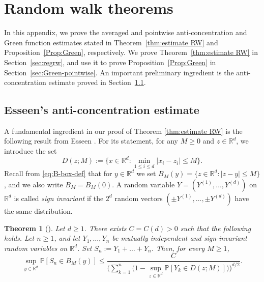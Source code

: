 \documentclass[11pt,a4paper]{article}
\numberwithin{equation}{section}
\theoremstyle{plain}
\newtheorem{Thm}{Theorem}[section]
\theoremstyle{definition}
\newcommand\1{\mathds{1}}
\begin{document}
\appendix

\section{Random walk theorems}
\label{appendix: rw}

In this appendix, we prove the averaged and pointwise
anti-concentration and Green function estimates stated in
Theorem~\ref{thm:estimate RW} and
Proposition~\ref{Prop:Green}, respectively.
We prove Theorem~\ref{thm:estimate RW} in Section~\ref{sec:regrw},
and use it to prove Proposition~\ref{Prop:Green} in Section~\ref{sec:Green-pointwise}.
An important preliminary ingredient is the anti-concentration estimate
proved in Section~\ref{sec:Esseen}.

\subsection{Esseen's anti-concentration estimate}
\label{sec:Esseen}

A fundamental ingredient in our proof of Theorem \ref{thm:estimate RW} is the following result from Esseen \cite{Esse66}.
For its statement, for any $M\geq 0$ and $z\in \mathbb R^d$, we introduce the set
\begin{equation}
D(z;M):=\{x\in \mathbb R^d:
\min_{1 \le i \le d}|x_i-z_i|\leq M\}.
\end{equation}
 Recall from \eqref{eq:B-box-def} that for $y\in \mathbb R^d$ we set $B_M(y)=\{z\in \mathbb R^d: |z-y|\leq M\}$, and we also write $B_M=B_M(0)$.
A random variable $Y=(Y^{(1)},\ldots,Y^{(d)})$ on $\mathbb R^d$ is called \emph{sign invariant} if
the $2^d$
random vectors $(\pm Y^{(1)},\ldots,\pm Y^{(d)})$ have the same distribution.

\begin{Thm}[]
\label{thm:esseen}
Let $d\geq 1$. There exists $C=C(d)>0$ such that the following holds. Let $n\geq 1$, and let $Y_1,\ldots,Y_n$ be mutually independent and sign-invariant random variables
on $\mathbb R^d$. Set $S_n:=Y_1+\ldots+Y_n$. Then, for every $M\geq 1$,
\begin{equation}
	\sup_{y\in \mathbb R^d}\mathbb P[S_n\in B_M(y)]\leq \frac{C}{\Big(\displaystyle\sum_{k=1}^n\big(1-\sup_{z\in \mathbb R^d}\mathbb P[Y_k\in D(z;M)]\big)\Big)^{d/2}}.
\end{equation}
\end{Thm}
\end{document}
